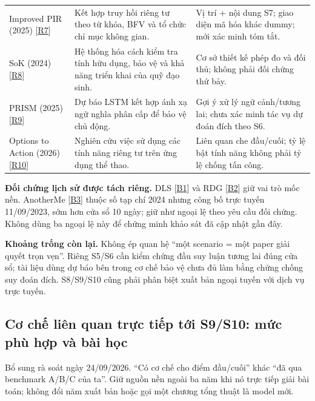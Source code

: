 \documentclass[10pt,a4paper]{article}
\begin{document}
\begin{longtable}{@{}P{3.839cm}P{6.301cm}P{6.498cm}@{}}
\addlinespace[3pt]
Improved PIR (2025) [\hyperlink{ref-R7}{R7}] & Kết hợp truy hồi riêng tư theo từ khóa, BFV và tổ chức chỉ mục không gian. & Vị trí + nội dung S7; giao diện mã hóa khác dummy; mới xác minh tóm tắt.\\
\addlinespace[3pt]
SoK (2024) [\hyperlink{ref-R8}{R8}] & Hệ thống hóa cách kiểm tra tính hữu dụng, bảo vệ và khả năng triển khai của quỹ đạo sinh. & Cơ sở thiết kế phép đo và đối thủ; không phải đối chứng thứ bảy.\\
\addlinespace[3pt]
PRISM (2025) [\hyperlink{ref-R9}{R9}] & Dự báo LSTM kết hợp ánh xạ ngữ nghĩa phân cấp để bảo vệ chủ động. & Gợi ý xử lý ngữ cảnh/tương lai; chưa xác minh tác vụ dự đoán đích theo S6.\\
\addlinespace[3pt]
Options to Action (2026) [\hyperlink{ref-R10}{R10}] & Nghiên cứu việc sử dụng các tính năng riêng tư trên ứng dụng thể thao. & Liên quan che đầu/cuối; tỷ lệ bật tính năng không phải tỷ lệ chống tấn công.\\
\end{longtable}
\endgroup
\textbf{Đối chứng lịch sử được tách riêng.} DLS [\hyperlink{ref-B1}{B1}] và RDG [\hyperlink{ref-B2}{B2}] giữ vai trò mốc nền. AnotherMe [\hyperlink{ref-B3}{B3}] thuộc số tạp chí 2024 nhưng công bố trực tuyến 11/09/2023, sớm hơn cửa sổ 10 ngày; giữ như ngoại lệ theo yêu cầu đối chứng. Không dùng ba ngoại lệ này để chứng minh khảo sát đã cập nhật gần đây.

\textbf{Khoảng trống còn lại.} Không ép quan hệ “một scenario = một paper giải quyết trọn vẹn”. Riêng S5/S6 cần kiểm chứng đầu suy luận tương lai đúng cửa sổ; tài liệu dùng dự báo bên trong cơ chế bảo vệ chưa đủ làm bằng chứng chống suy đoán đích. S8/S9/S10 cũng phải phân biệt xuất bản ngoại tuyến với dịch vụ trực tuyến.


\clearpage
\subsection{Cơ chế liên quan trực tiếp tới S9/S10: mức phù hợp và bài học}
Bổ sung rà soát ngày 24/09/2026. “Có cơ chế cho điểm đầu/cuối” khác “đã qua benchmark A/B/C của ta”. Giữ nguồn nền ngoài ba năm khi nó trực tiếp giải bài toán; không đổi năm xuất bản hoặc gọi một chương tổng thuật là model mới.
\end{document}
